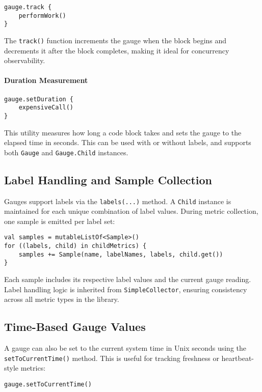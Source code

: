 \begin{verbatim}
gauge.track {
    performWork()
}
\end{verbatim}

The \texttt{track()} function increments the gauge when the block begins and decrements it after the block completes, making it ideal for concurrency observability.

\paragraph{Duration Measurement}

\begin{verbatim}
gauge.setDuration {
    expensiveCall()
}
\end{verbatim}

This utility measures how long a code block takes and sets the gauge to the elapsed time in seconds. This can be used with or without labels, and supports both \texttt{Gauge} and \texttt{Gauge.Child} instances.

\subsection{Label Handling and Sample Collection}
Gauges support labels via the \texttt{labels(...)} method. A \texttt{Child} instance is maintained for each unique combination of label values. During metric collection, one sample is emitted per label set:

\begin{verbatim}
val samples = mutableListOf<Sample>()
for ((labels, child) in childMetrics) {
    samples += Sample(name, labelNames, labels, child.get())
}
\end{verbatim}

Each sample includes its respective label values and the current gauge reading. Label handling logic is inherited from \texttt{SimpleCollector}, ensuring consistency across all metric types in the library.

\subsection{Time-Based Gauge Values}
A gauge can also be set to the current system time in Unix seconds using the \texttt{setToCurrentTime()} method. This is useful for tracking freshness or heartbeat-style metrics:

\begin{verbatim}
gauge.setToCurrentTime()
\end{verbatim}

